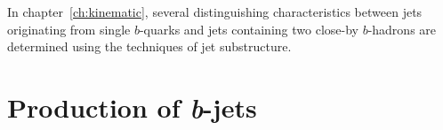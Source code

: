 

In chapter~\ref{ch:kinematic}, several distinguishing characteristics between jets originating from single $b$-quarks and jets containing two close-by  $b$-hadrons are determined using the techniques of jet substructure. 







\section{Production of {\em b\hspace{0.5mm}}-jets}\label{sec:bjet-production}

